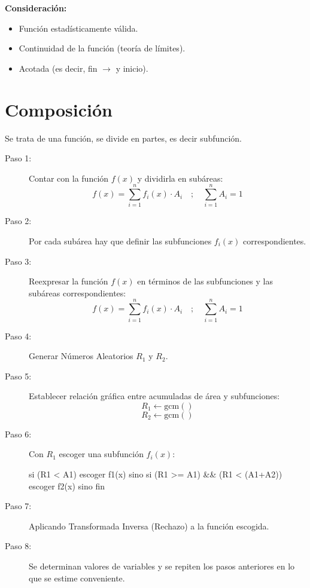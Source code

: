 \documentclass{article}
\begin{document}
\textbf{Consideración:}
\begin{itemize}
    \item Función estadísticamente válida.
    \item Continuidad de la función (teoría de límites).
    \item Acotada (es decir, fin $\rightarrow$ y inicio).
\end{itemize}

\section{Composición}

Se trata de una función, se divide en partes, es decir subfunción.

\begin{description}
    \item[Paso 1:] Contar con la función $f(x)$ y dividirla en subáreas:
    $$ f(x) = \sum_{i=1}^{n} f_i(x) \cdot A_i \quad ; \quad \sum_{i=1}^{n} A_i = 1 $$

    \item[Paso 2:] Por cada subárea hay que definir las subfunciones 
    $f_i(x)$ correspondientes.

    \item[Paso 3:] Reexpresar la función $f(x)$ en términos de las 
    subfunciones y las subáreas correspondientes:
    $$ f(x) = \sum_{i=1}^{n} f_i(x) \cdot A_i \quad ; \quad \sum_{i=1}^{n} A_i = 1 $$

    \item[Paso 4:] Generar Números Aleatorios $R_1$ y $R_2$.

    \item[Paso 5:] Establecer relación gráfica entre acumuladas de área 
    y subfunciones:
    $$ R_1 \leftarrow \text{gcm}() $$
    $$ R_2 \leftarrow \text{gcm}() $$

    \item[Paso 6:] Con $R_1$ escoger una subfunción $f_i(x)$:
    \begin{Algoritmo}{}
si (R1 < A1)
    escoger f1(x)
sino si (R1 >= A1) && (R1 < (A1+A2))
    escoger f2(x)
sino
    fin
    \end{Algoritmo}

    \item[Paso 7:] Aplicando Transformada Inversa (Rechazo) a la 
    función escogida.

    \item[Paso 8:] Se determinan valores de variables y se repiten 
    los pasos anteriores en lo que se estime conveniente.
\end{description}
\end{document}
